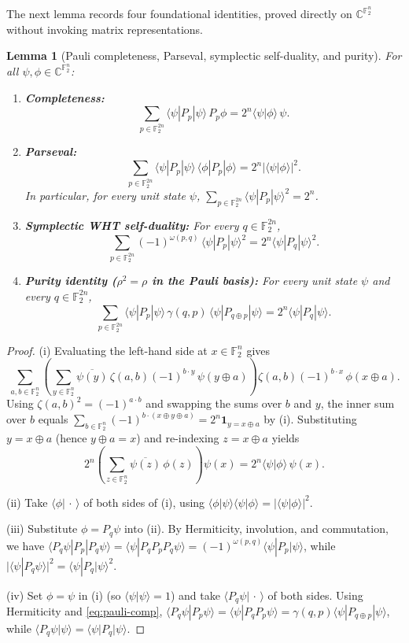 \documentclass[11pt,a4paper]{article}
\theoremstyle{plain}
\newtheorem{lemma}{Lemma}[section]
\theoremstyle{definition}
\theoremstyle{remark}
\newcommand{\C}{\mathbb{C}}
\newcommand{\F}{\mathbb{F}}
\newcommand{\braket}[2]{\langle#1|#2\rangle}
\newcommand{\expval}[2]{\langle#1|#2|#1\rangle}
\newcommand{\abs}[1]{\lvert#1\rvert}
\newcommand{\indic}[1]{\mathbf{1}_{#1}}
\numberwithin{equation}{section}
\begin{document}
The next lemma records four foundational identities, proved directly on $\C^{\F_2^n}$ without invoking matrix representations.

\begin{lemma}[Pauli completeness, Parseval, symplectic self-duality, and purity]\label{lem:pauli-identities}
For all $\psi, \phi \in \C^{\F_2^n}$:
\begin{enumerate}[label=(\roman*),leftmargin=2em]
  \item \textbf{Completeness:}
  \[
    \sum_{p \in \F_2^{2n}} \expval{\psi}{P_p}\, P_p \phi = 2^n \braket{\psi}{\phi}\,\psi.
  \]
  \item \textbf{Parseval:}
  \[
    \sum_{p \in \F_2^{2n}} \expval{\psi}{P_p}\,\expval{\phi}{P_p} = 2^n \abs{\braket{\psi}{\phi}}^2.
  \]
  In particular, for every unit state $\psi$, $\sum_{p \in \F_2^{2n}} \expval{\psi}{P_p}^2 = 2^n$.
  \item \textbf{Symplectic WHT self-duality:} For every $q \in \F_2^{2n}$,
  \[
    \sum_{p \in \F_2^{2n}} (-1)^{\omega(p, q)}\,\expval{\psi}{P_p}^2 = 2^n \expval{\psi}{P_q}^2.
  \]
  \item \textbf{Purity identity ($\rho^2 = \rho$ in the Pauli basis):} For every unit state $\psi$ and every $q \in \F_2^{2n}$,
  \[
    \sum_{p \in \F_2^{2n}} \expval{\psi}{P_p}\,\gamma(q, p)\,\expval{\psi}{P_{q \oplus p}} = 2^n \expval{\psi}{P_q}.
  \]
\end{enumerate}
\end{lemma}

\begin{proof}
(i) Evaluating the left-hand side at $x \in \F_2^n$ gives
\[
  \sum_{a, b \in \F_2^n} \left(\sum_{y \in \F_2^n} \overline{\psi(y)}\,\zeta(a,b)(-1)^{b \cdot y}\,\psi(y \oplus a)\right) \zeta(a,b)(-1)^{b \cdot x}\,\phi(x \oplus a).
\]
Using $\zeta(a,b)^2 = (-1)^{a \cdot b}$ and swapping the sums over $b$ and $y$, the inner sum over $b$ equals $\sum_{b \in \F_2^n} (-1)^{b \cdot (x \oplus y \oplus a)} = 2^n \indic{y = x \oplus a}$ by (i). Substituting $y = x \oplus a$ (hence $y \oplus a = x$) and re-indexing $z = x \oplus a$ yields
\[
  2^n \left(\sum_{z \in \F_2^n} \overline{\psi(z)}\,\phi(z)\right)\psi(x) = 2^n \braket{\psi}{\phi}\,\psi(x).
\]

(ii) Take $\braket{\phi}{\,\cdot\,}$ of both sides of (i), using $\braket{\phi}{\psi}\braket{\psi}{\phi} = \abs{\braket{\psi}{\phi}}^2$.

(iii) Substitute $\phi = P_q \psi$ into (ii). By Hermiticity, involution, and commutation, we have $\expval{P_q\psi}{P_p} = \braket{\psi}{P_q P_p P_q \psi} = (-1)^{\omega(p,q)}\expval{\psi}{P_p}$, while $\abs{\braket{\psi}{P_q\psi}}^2 = \expval{\psi}{P_q}^2$.

(iv) Set $\phi = \psi$ in (i) (so $\braket{\psi}{\psi} = 1$) and take $\braket{P_q \psi}{\,\cdot\,}$ of both sides. Using Hermiticity and \eqref{eq:pauli-comp}, $\braket{P_q \psi}{P_p \psi} = \braket{\psi}{P_q P_p \psi} = \gamma(q,p)\expval{\psi}{P_{q \oplus p}}$, while $\braket{P_q\psi}{\psi} = \expval{\psi}{P_q}$.
\end{proof}
\end{document}

